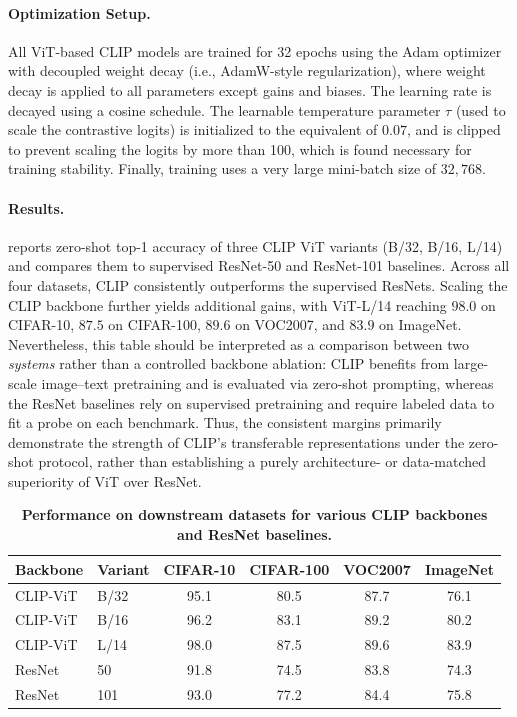 \documentclass[../../book-main.tex]{subfiles}
\begin{document}
\paragraph{Optimization Setup.}
All ViT-based CLIP models are trained for 32 epochs using the Adam optimizer with decoupled weight decay (i.e., AdamW-style regularization), where weight decay is applied to all parameters except gains and biases.
The learning rate is decayed using a cosine schedule. The learnable temperature parameter \(\tau\) (used to scale the contrastive logits) is initialized to the equivalent of \(0.07\), and is clipped to prevent scaling the logits by more than 100, which is found necessary for training stability.
Finally, training uses a very large mini-batch size of \(32{,}768\).

\paragraph{Results.}  reports zero-shot top-1 accuracy of three CLIP ViT variants (B/32, B/16, L/14) and compares them to supervised ResNet-50 and ResNet-101 baselines.
Across all four datasets, CLIP consistently outperforms the supervised ResNets.
Scaling the CLIP backbone further yields additional gains, with ViT-L/14 reaching \(98.0\) on CIFAR-10, \(87.5\) on CIFAR-100, \(89.6\) on VOC2007, and \(83.9\) on ImageNet.
Nevertheless, this table should be interpreted as a comparison between two \textit{systems} rather than a controlled backbone ablation: CLIP benefits from large-scale image--text pretraining and is evaluated via zero-shot prompting, whereas the ResNet baselines rely on supervised pretraining and require labeled data to fit a probe on each benchmark.
Thus, the consistent margins primarily demonstrate the strength of CLIP's transferable representations under the zero-shot protocol, rather than establishing a purely architecture- or data-matched superiority of ViT over ResNet.

\begin{table}[t]
\centering
\begin{tabular}{@{}llcccc@{}}
\toprule
Backbone & Variant & CIFAR-10 & CIFAR-100 & VOC2007 & ImageNet \\
\midrule
CLIP-ViT & B/32 & 95.1 & 80.5 & 87.7 & 76.1 \\
CLIP-ViT & B/16 & 96.2 & 83.1 & 89.2 & 80.2 \\
CLIP-ViT & L/14 & 98.0 & 87.5 & 89.6 & 83.9 \\
\midrule
ResNet & 50  & 91.8 & 74.5 & 83.8 & 74.3 \\
ResNet & 101 & 93.0 & 77.2 & 84.4 & 75.8 \\
\bottomrule
\end{tabular}
\caption{\small\textbf{Performance on downstream datasets for various CLIP backbones and ResNet baselines.}}
\label{tab:clip_vs_resnet}
\end{table}
\end{document}
